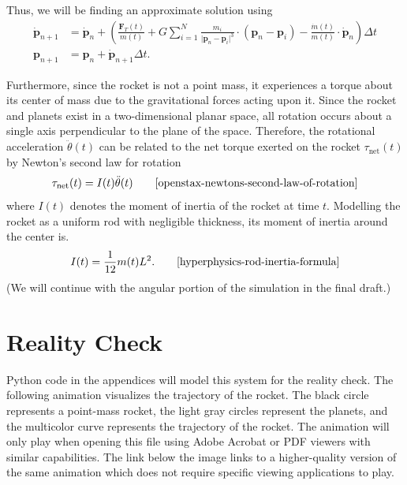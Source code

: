\documentclass{article}
\begin{document}
Thus, we will be finding an approximate solution using
\begin{align*}
    \dot{\bm{p}}_{n+1} &= \dot{\bm{p}}_n + \left(
    \frac{\bm{F}_T(t)}{m(t)} + G\sum_{i=1}^{N}\frac{m_i}{\lvert \bm{p}_n - \bm{p}_i \rvert^3} \cdot (\bm{p}_n - \bm{p}_i) - \frac{\dot{m}(t)}{m(t)} \cdot \dot{\bm{p}}_n \right)\Delta t \\
    \bm{p}_{n+1} &= \bm{p}_{n} + \dot{\bm{p}}_{n+1}\Delta t.
\end{align*}

\vspace{1cm}


Furthermore, since the rocket is not a point mass, it experiences a torque about its center of mass due to the gravitational forces acting upon it. Since the rocket and planets exist in a two-dimensional planar space, all rotation occurs about a single axis perpendicular to the plane of the space. Therefore, the rotational acceleration $\ddot{\theta}(t)$ can be related to the net torque exerted on the rocket $\tau_\text{net}(t)$ by Newton's second law for rotation 
\[
\tau_\text{net}(t) = I(t)\ddot{\theta}(t) \qquad\cite{openstax-newtons-second-law-of-rotation}
\]
where $I(t)$ denotes the moment of inertia of the rocket at time $t$. Modelling the rocket as a uniform rod with negligible thickness, its moment of inertia around the center is.
\[
I(t)=\frac{1}{12}m(t)L^2. \qquad\cite{hyperphysics-rod-inertia-formula}
\]
(We will continue with the angular portion of the simulation in the final draft.)

\section{Reality Check}
Python code in the appendices will model this system for the reality check.
The following animation visualizes the trajectory of the rocket. The black circle represents a point-mass rocket, the light gray circles represent the planets, and the multicolor curve represents the trajectory of the rocket. The animation will only play when opening this file using Adobe Acrobat or PDF viewers with similar capabilities. The link below the image links to a higher-quality version of the same animation which does not require specific viewing applications to play.\\
\end{document}
